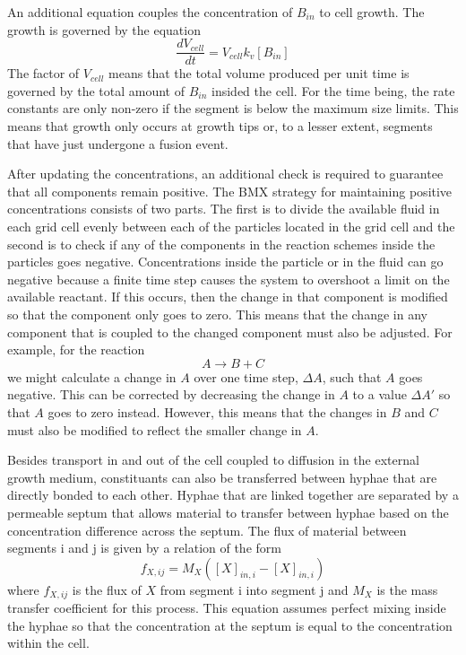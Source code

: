 \documentclass[12pt]{article}
\begin{document}
An additional equation couples the concentration of $B_{in}$ to cell growth.
The growth is governed by the equation
\[
\frac{dV_{cell}}{dt} = V_{cell}k_v[B_{in}]
\]
The factor of $V_{cell}$ means that the total volume produced per unit time is
governed by the total amount of $B_{in}$ insided the cell. For the time being,
the rate constants are only non-zero if the segment is below the maximum size
limits. This means that growth only occurs at growth tips or, to a lesser
extent, segments that have just undergone a fusion event.

After updating the concentrations, an additional check is required to guarantee
that all components remain positive.
The BMX strategy for maintaining positive concentrations consists of two parts.
The first is to divide the available fluid in each grid cell evenly between each
of the particles located in the grid cell and the second is to check if any of the
components in the reaction schemes inside the particles goes negative.
Concentrations inside the particle or in the fluid can go negative because a
finite time step causes the system to overshoot a limit on the available reactant.
If this occurs, then the change in that component is modified so that the component
only goes to zero. This means that the change in any component that is coupled to
the changed component must also be adjusted. For example, for the reaction
\[
A \longrightarrow B + C
\]
we might calculate a change in $A$ over one time step, $\Delta A$, such that $A$
goes negative. This can be corrected by decreasing the change in $A$ to a value
$\Delta A'$ so that $A$ goes to zero instead. However, this means that the changes
in $B$ and $C$ must also be modified to reflect the smaller change in $A$.

Besides transport in and out of the cell coupled to diffusion in the external
growth medium, constituants can also be transferred between hyphae that are directly
bonded to each other. Hyphae that are linked together are separated by a permeable septum
that allows material to transfer between hyphae based on the concentration difference
across the septum. The flux of material between segments i and j is given by a relation
of the form
\[
f_{X,ij} = M_X ([X]_{in,i}-[X]_{in,i})
\]
where $f_{X,ij}$ is the flux of $X$ from segment i into segment j and $M_X$ is the mass
transfer coefficient for this process. This equation assumes perfect mixing inside the hyphae
so that the concentration at the septum is equal to the concentration within the cell.
\end{document}
